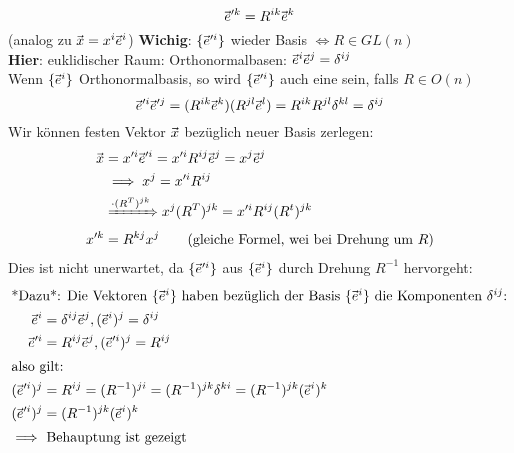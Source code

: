 \documentclass[a4paper]{scrartcl}
\renewcommand{\v}[1]{\mathrlap{\vec{\mkern-2mu\phantom{#1}}}#1}
\theoremstyle{definition}
\theoremstyle{plain}
\theoremstyle{remark}
\theoremstyle{remark}
\begin{document}
\[\v e^{\prime k} = R^{ik} \v e^k\]
(analog zu $\v x = x^i \v e^i$)
\textbf{Wichig}: $\{\v e^{\prime i}\}$ wieder Basis $\iff R \in GL(n)$ \\
   \textbf{Hier}: euklidischer Raum: Orthonormalbasen: $\v e^i \v e^j = \delta^{ij}$ \\
   Wenn $\{\v e^{i}\}$ Orthonormalbasis, so wird $\{\v e^{\prime i}\}$ auch eine sein, falls $R\in O(n)$
\[\v e^{\prime i} \v e^{\prime j} = (R^{ik} \v e^k)(R^{jl} \v e^l) = R^{ik} R^{jl} \delta^{kl} = \delta^{ij}\]
Wir können festen Vektor $\v x$ bezüglich neuer Basis zerlegen:
\begin{align*}
\v x &= x^{\prime i} \v e^{\prime i} = x^{\prime i} R^{ij} \v e^{j} = x^j \v e^j \\
&\implies x^j = x^{\prime i} R^{ij} \\
&\xRightarrow{\cdot (R^T)^{jk}} x^j (R^T)^{jk} = x^{\prime i} R^{ij} (R^t)^{jk} \\
x^{\prime k} &= R^{kj} x^j \tag{gleiche Formel, wei bei Drehung um $R$}
\end{align*}
Dies ist nicht unerwartet, da $\{\v e^{\prime i}\}$ aus $\{\v e^i\}$ durch Drehung $R^{-1}$ hervorgeht:
\begin{align*}
\intertext{*Dazu*: Die Vektoren $\{\v e^i\}$ haben bezüglich der Basis $\{\v e^i\}$ die Komponenten $\delta^{ij}$:}
\v e^i &= \delta^{ij} \v e^j, (\v e^i)^j = \delta^{ij} \\
\v e^{\prime i} &= R^{ij} \v e^j, (\v e^{\prime i})^j = R^{ij} \\
\intertext{also gilt:}
(\v e^{\prime i})^j &= R^{ij} = (R^{-1})^{ji} = (R^{-1})^{jk} \delta^{ki} = (R^{-1})^{jk} (\v e^i)^k \\
(\v e^{\prime i})^j &= (R^{-1})^{jk} (\v e^i)^k \\
\intertext{$\implies$ Behauptung ist gezeigt}
\end{align*}
\end{document}
